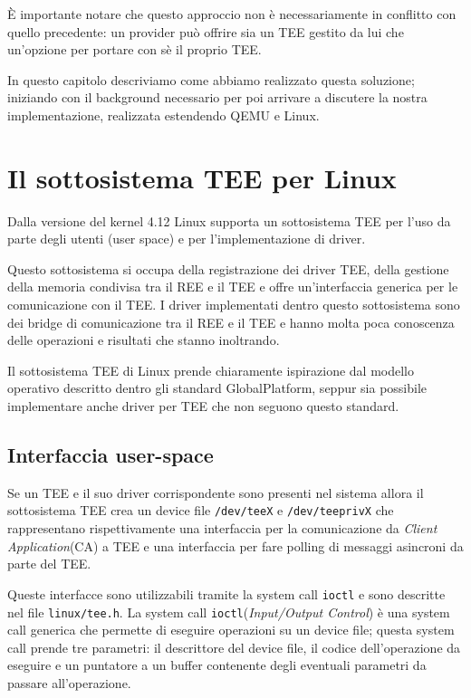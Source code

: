 \documentclass[12pt,italian]{report}
\begin{document}
È importante notare che questo approccio non è necessariamente in conflitto
con quello precedente: un provider può offrire sia un TEE gestito da lui
che un'opzione per portare con sè il proprio TEE.

\bigbreak \noindent

In questo capitolo descriviamo come abbiamo realizzato questa soluzione;
iniziando con il background necessario per poi arrivare a discutere la nostra
implementazione, realizzata estendendo QEMU e Linux. 

\section{Il sottosistema TEE per Linux}
\label{sec:sottosistema-tee-per-linux}
Dalla versione del kernel 4.12 Linux supporta un sottosistema TEE
\cite{linux_tee_subsystem}
per l'uso da parte degli utenti (user space) e per l'implementazione
di driver.

Questo sottosistema si occupa della registrazione dei driver TEE, della
gestione della memoria condivisa tra il REE e il TEE e offre un'interfaccia
generica per le comunicazione con il TEE.
I driver implementati dentro questo sottosistema sono dei bridge di
comunicazione tra il REE e il TEE e hanno molta poca conoscenza delle
operazioni e risultati che stanno inoltrando.

Il sottosistema TEE di Linux prende chiaramente ispirazione dal modello
operativo descritto dentro gli standard GlobalPlatform, seppur sia possibile
implementare anche driver per TEE che non seguono questo standard.

\subsection{Interfaccia user-space}
\label{subsec:interfaccia-user-space}
Se un TEE e il suo driver corrispondente sono presenti nel sistema allora
il sottosistema TEE crea un device file \texttt{/dev/teeX} e
\texttt{/dev/teeprivX} che rappresentano rispettivamente una interfaccia
per la comunicazione da \textit{Client Application}(CA) a TEE e una
interfaccia per fare polling di messaggi asincroni da parte del TEE.

Queste interfacce sono utilizzabili tramite la system call \texttt{ioctl}
e sono descritte nel file \texttt{linux/tee.h}.
La system call \texttt{ioctl}(\textit{Input/Output Control})
è una system call generica che permette di
eseguire operazioni su un device file; questa system call
prende tre parametri:
il descrittore del device file, il codice dell'operazione da eseguire e
un puntatore a un buffer contenente degli eventuali parametri da passare
all'operazione.
\end{document}
